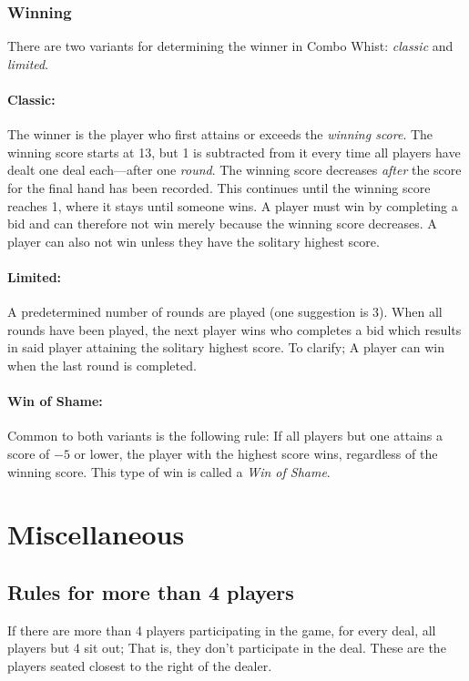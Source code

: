 \documentclass[a4paper]{article}
\begin{document}
	\subsubsection{Winning}
	\label{sec:winning}
	There are two variants for determining the winner in Combo Whist: \emph{classic} and \emph{limited}.

	\paragraph{Classic:}
	The winner is the player who first attains or exceeds the \emph{winning score}. The winning score starts at 13, but 1 is subtracted from it every time all players have dealt one deal each---after one \emph{round}. The winning score decreases \emph{after} the score for the final hand has been recorded. This continues until the winning score reaches 1, where it stays until someone wins. A player must win by completing a bid and can therefore not win merely because the winning score decreases. A player can also not win unless they have the solitary highest score.

	\paragraph{Limited:}
	A predetermined number of rounds are played (one suggestion is 3). When all rounds have been played, the next player wins who completes a bid which results in said player attaining the solitary highest score. To clarify; A player can win when the last round is completed.

	\paragraph{Win of Shame:}
	Common to both variants is the following rule: If all players but one attains a score of $-5$ or lower, the player with the highest score wins, regardless of the winning score. This type of win is called a \emph{Win of Shame}.

	\section{Miscellaneous}
	\subsection{Rules for more than 4 players}
	If there are more than 4 players participating in the game, for every deal, all players but 4 sit out; That is, they don't participate in the deal. These are the players seated closest to the right of the dealer.
		
\end{document}

